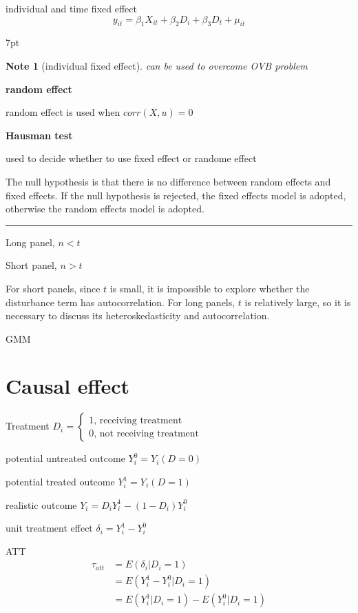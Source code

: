 \documentclass{article}
\newcommand*\sepline{%
  \begin{center}
    \rule[1ex]{.5\textwidth}{.5pt}
  \end{center}}
\newenvironment{blueblock}{
\def\FrameCommand{
  \hspace{1pt}
    {\color{DarkBlue}
    \vrule width 2pt}
    {\color{blueshade}
    \vrule width 4pt}
  \colorbox{blueshade}
}
\MakeFramed{
  \advance
  \hsize-
  \width
  \FrameRestore}
\noindent\hspace{-4.55pt}%
\begin{adjustwidth}{}{7pt}
\vspace{2pt}\vspace{2pt}
}
{\vspace{2pt}\end{adjustwidth}\endMakeFramed}
\newtheorem{note}{Note}
\begin{document}
individual and time fixed effect
\begin{equation}
  y_{it}=\beta_1 X_{it}+\beta_2D_i+\beta_3D_t+\mu_{it}
\end{equation}


\begin{blueblock}
\begin{note}[individual fixed effect]
can be used to overcome OVB problem
\end{note}
\end{blueblock}



\textbf{random effect}

random effect is used when $corr(X,u)=0$

\textbf{Hausman test}

used to decide whether to use fixed effect or randome effect

The null hypothesis is that there is no difference between random effects and fixed effects. If the null hypothesis is rejected, the fixed effects model is adopted, otherwise the random effects model is adopted.

\sepline

Long panel, $n<t$

Short panel, $n>t$

For short panels, since $t$ is small, it is impossible to explore whether the disturbance term has autocorrelation. For long panels, $t$ is relatively large, so it is necessary to discuss its heteroskedasticity and autocorrelation.

GMM


\section{Causal effect}

Treatment
$D_i=
\begin{cases}
  1 \text{, receiving treatment}\\
  0 \text{, not receiving treatment}
\end{cases}$

potential untreated outcome
$Y_{i}^{0}=Y_{i}(D=0)$

potential treated outcome
$Y_{i}^{1}=Y_{i}(D=1)$

realistic outcome
$Y_{i}=D_{i}Y_{i}^{1}-(1-D_{i})Y_{i}^{0}$

unit treatment effect
$\delta_{i}=Y_{i}^{1}-Y_{i}^{0}$

ATT
\begin{equation}
\begin{split}
\tau_{att}&=E(\delta_{i}|D_{i}=1)
\\&=E(Y^{1}_{i}-Y^{0}_{i}|D_{i}=1)
\\&=E(Y^{1}_{i}|D_{i}=1)-E(Y^{0}_{i}|D_{i}=1)
\end{split}
\end{equation}
\end{document}
